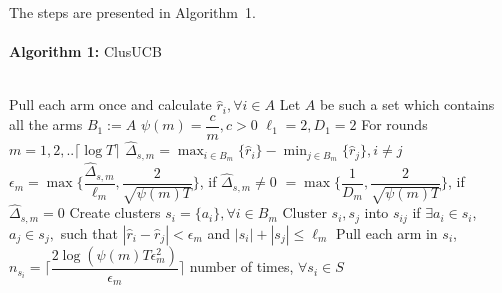 The steps are presented in Algorithm~1.\\%
\noindent\makebox[\linewidth]{\rule{\textwidth}{0.8pt}}\\[-0.1cm]
\textbf{Algorithm 1:} ClusUCB\\[-0.3cm]
\noindent\makebox[\linewidth]{\rule{\textwidth}{0.4pt}}\\[-0.3cm]
\begin{algorithmic}[1]
\State Pull each arm once and calculate $\hat{r}_{i}, \forall i\in A$
\State Let $A$ be such a set which contains all the arms
\State $B_{1}:=A$
\State $\psi(m)=\dfrac{c}{m}, c>0$
\State $\ell_{1}=2,D_{1}=2$
\State For rounds $m=1,2,.. \lceil\log T\rceil$
\State \hspace*{2em} $\hat{\Delta}_{s,m}=\max_{i\in B_{m}}{\lbrace\hat{r}_{i}\rbrace}-\min_{j\in B_{m}}{\lbrace\hat{r}_{j}\rbrace}, i\neq j$
\State \hspace*{2em} $\epsilon_{m}=\max{\bigg\lbrace\dfrac{\hat{\Delta}_{s,m}}{\ell_{m}}, \dfrac{2}{\sqrt{\psi{(m)T}}}\bigg\rbrace}$, if $\hat{\Delta}_{s,m}\neq 0$
\newline\hspace*{3.7em}$=\max{\bigg\lbrace\dfrac{1}{D_{m}}, \dfrac{2}{\sqrt{\psi{(m)T}}}\bigg\rbrace}$, if $\hat{\Delta}_{s,m}=0$ 
\State \hspace*{2em} Create clusters $s_{i}=\lbrace a_{i}\rbrace, \forall i\in B_{m}$
\State \hspace*{2em} Cluster $s_{i},s_{j}$ into $s_{ij}$ if $\exists a_{i}\in s_{i} $, $ a_{j}\in s_{j},$ such that $|\hat{r}_{i}-\hat{r}_{j}|<\epsilon_{m}$ and \hspace*{2em} $|s_{i}|+|s_{j}|\leq \ell_{m}$
\State \hspace*{2em} Pull each arm in $s_{i}$, \newline\hspace*{2em}$n_{s_{i}}=\bigg\lceil\dfrac{2\log{(\psi(m)T\epsilon_{m}^{2})}}{\epsilon_{m}}\bigg\rceil$ number of times, $\forall s_{i}\in S$ 

\end{algorithmic}

